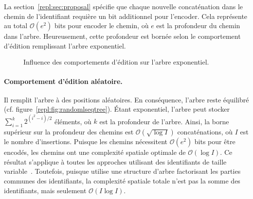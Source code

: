 La section~\ref{repl:sec:proposal} spécifie que chaque nouvelle concaténation
dans le chemin de l'identifiant requière un bit additionnel pour l'encoder. Cela
représente au total $\mathcal{O}(e^2)$ bits pour encoder le chemin, où $e$ est
la profondeur du chemin dans l'arbre. Heureusement, cette profondeur est bornée
selon le comportement d'édition remplissant l'arbre exponentiel. 


\begin{figure}
  \begin{center}
    \hspace{10pt}
    \hspace{10pt}
    \caption[Influence des comportements d'édition sur l'arbre exponentiel]
    {Influence des comportements d'édition sur l'arbre exponentiel.}
  \end{center}
\end{figure}


\paragraph{Comportement d'édition aléatoire. } Il remplit l'arbre à des
positions aléatoires. En conséquence, l'arbre reste équilibré
(cf. figure~\ref{repl:fig:randomlseqtree}). Étant exponentiel, l'arbre peut
stocker $\textstyle\sum\nolimits_{i=1}^{k}{2^{(i^2-i)/2}}$ éléments, où $k$ est
la profondeur de l'arbre. Ainsi, la borne supérieur sur la profondeur des
chemins est $\mathcal{O}(\sqrt{\log I})$ concaténations, où $I$ est le nombre
d'insertions. Puisque les chemins nécessitent $\mathcal{O}(e^2)$ bits pour être
encodés, les chemins ont une complexité spatiale optimale de
$\mathcal{O}(\log I)$. Ce résultat s'applique à toutes les approches utilisant
des identifiants de taille variable~\cite{preguica2009commutative,
  weiss2009logoot}. Toutefois, puisque \LSEQ utilise une structure d'arbre
factorisant les parties communes des identifiants, la complexité spatiale totale
n'est pas la somme des identifiants, mais seulement $\mathcal{O}(I\log I)$.

